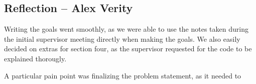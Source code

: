 \documentclass{article}
\begin{document}
\subsection{Reflection -- Alex Verity}

Writing the goals went smoothly, as we were able to use the notes taken during
the initial supervisor meeting directly when making the goals. We also easily
decided on extras for section four, as the supervisor requested for the code
to be explained thorougly.\newline

A particular pain point was finalizing the problem statement, as it needed to
\end{document}
